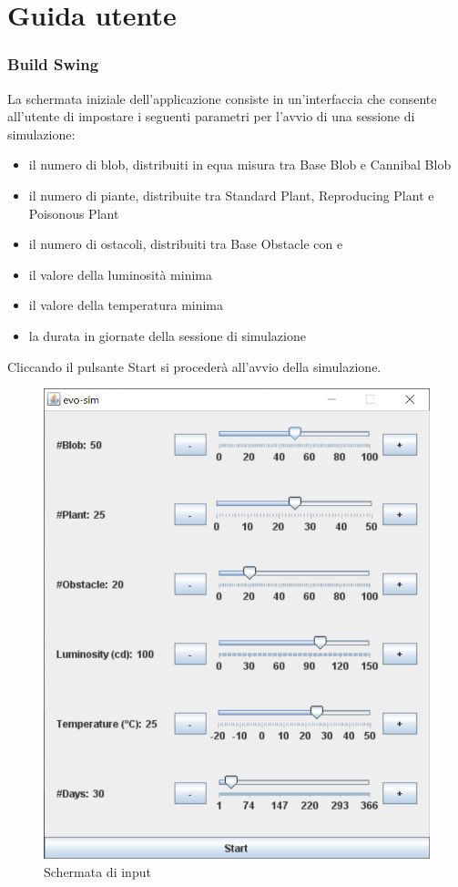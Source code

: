\chapter{Guida utente}

\subsection{Build Swing}
La schermata iniziale dell'applicazione consiste in un'interfaccia che consente all'utente di impostare i seguenti parametri per l'avvio di una sessione di simulazione:
\begin{itemize}
\item il numero di blob, distribuiti in equa misura tra Base Blob e Cannibal Blob
\item il numero di piante, distribuite tra Standard Plant, Reproducing Plant e Poisonous Plant
\item il numero di ostacoli, distribuiti tra Base Obstacle con  e 
\item il valore della luminosità minima
\item il valore della temperatura minima
\item la durata in giornate della sessione di simulazione
\end{itemize}

Cliccando il pulsante Start si procederà all'avvio della simulazione.

\begin{figure}[h!]
\centering
\includegraphics[scale=0.5]{img/InputInterface.png}
\caption{Schermata di input}
\label{fig:InputInterface}
\end{figure}

